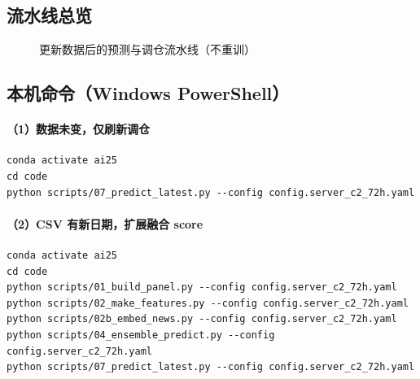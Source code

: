 \documentclass[UTF8,a4paper,12pt]{ctexart}
\begin{document}
\subsection{流水线总览}

\begin{figure}[H]
\centering
{}
\caption{更新数据后的预测与调仓流水线（不重训）}
\label{fig:predict-pipe}
\end{figure}

\subsection{本机命令（Windows PowerShell）}

\paragraph{（1）数据未变，仅刷新调仓}

\begin{verbatim}
conda activate ai25
cd code
python scripts/07_predict_latest.py --config config.server_c2_72h.yaml
\end{verbatim}

\paragraph{（2）CSV 有新日期，扩展融合 score}

\begin{verbatim}
conda activate ai25
cd code
python scripts/01_build_panel.py --config config.server_c2_72h.yaml
python scripts/02_make_features.py --config config.server_c2_72h.yaml
python scripts/02b_embed_news.py --config config.server_c2_72h.yaml
python scripts/04_ensemble_predict.py --config config.server_c2_72h.yaml
python scripts/07_predict_latest.py --config config.server_c2_72h.yaml
\end{verbatim}
\end{document}
